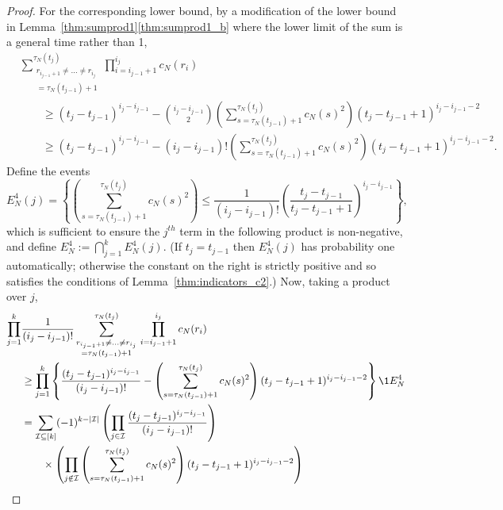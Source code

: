 \begin{proof}
For the corresponding lower bound, by a modification of the lower bound in Lemma~\ref{thm:sumprod1}\ref{thm:sumprod1_b} where the lower limit of the sum is a general time rather than 1,
\begin{align*}
&\sum_{\substack{ r_{i_{j-1}+1} \neq \dots \neq r_{i_j} 
        \\ = \tau_N(t_{j-1})+1 }}^{\tau_N(t_j)}
        \prod_{i=i_{j-1}+1}^{i_j} c_N(r_i) \\
&\qquad\geq (t_j - t_{j-1})^{i_j - i_{j-1}}
        - \binom{i_j - i_{j-1}}{2} \left( \sum_{s=\tau_N(t_{j-1})+1}^{\tau_N(t_j)}        
        c_N(s)^2 \right) ( t_j - t_{j-1} +1 )^{i_j - i_{j-1} -2} \\
&\qquad\geq (t_j - t_{j-1})^{i_j - i_{j-1}}
        - (i_j - i_{j-1})! \left( \sum_{s=\tau_N(t_{j-1})+1}^{\tau_N(t_j)}
        c_N(s)^2 \right) ( t_j - t_{j-1} +1 )^{i_j - i_{j-1} -2} .
\end{align*}
Define the events
\begin{equation*}
E_N^4(j)
= \left\{ \left( \sum_{s=\tau_N(t_{j-1})+1}^{\tau_N(t_j)} c_N(s)^2 \right)
        \leq \frac{1}{(i_j - i_{j-1}) !}  \left( \frac{ t_j - t_{j-1} }{ t_j - t_{j-1} +1 }
        \right)^{i_j - i_{j-1}} \right\} ,
\end{equation*}
which is sufficient to ensure the $j^{th}$ term in the following product is non-negative,
and define 
$E_N^4 := \bigcap_{j=1}^k E_N^4(j)$.
(If $t_j = t_{j-1}$ then $E_N^4(j)$ has probability one automatically; otherwise the constant on the right is strictly positive and so satisfies the conditions of Lemma~\ref{thm:indicators_c2}.)
Now, taking a product over $j$, 
\begin{align*}
\prod_{j=1}^k &\frac{1}{(i_j - i_{j-1})!}
        \sum_{\substack{ r_{i_{j-1}+1} \neq \dots \neq r_{i_j} \\ = \tau_N(t_{j-1})+1}}
        ^{\tau_N(t_j)}  \,\prod_{i=i_{j-1}+1}^{i_j} c_N(r_i) \notag\\
&\geq \prod_{j=1}^k \left\{ \frac{(t_j - t_{j-1})^{i_j - i_{j-1}}}{(i_j - i_{j-1})!}  
        - \left( \sum_{s=\tau_N(t_{j-1})+1}^{\tau_N(t_j)} c_N(s)^2 \right)
        ( t_j - t_{j-1} +1 )^{i_j - i_{j-1} -2} \right\} \1{E_N^4} \notag\\
&= \sum_{\mathcal{I} \subseteq [k]} (-1)^{k-|\mathcal{I}|} 
        \left( \prod_{j\in\mathcal{I}} \frac{(t_j - t_{j-1})^{i_j - i_{j-1}}}
        {(i_j - i_{j-1})!} \right) \\
    &\qquad\times \left( \prod_{j\notin\mathcal{I}} \left( 
        \sum_{s=\tau_N(t_{j-1})+1}
        ^{\tau_N(t_j)} c_N(s)^2 \right) ( t_j - t_{j-1} +1 )^{i_j - i_{j-1} -2} \right) 

\end{align*}
\end{proof}
